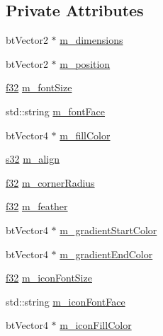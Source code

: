 \subsection*{Private Attributes}
\begin{DoxyCompactItemize}
\item 
bt\+Vector2 $\ast$ \mbox{\hyperlink{classnjli_1_1_checkbox_h_u_d_af97939ec2d8f7137dd7206aaef82ebeb}{m\+\_\+dimensions}}
\item 
bt\+Vector2 $\ast$ \mbox{\hyperlink{classnjli_1_1_checkbox_h_u_d_a15d15c4ef020a1d109c1257b535ef6af}{m\+\_\+position}}
\item 
\mbox{\hyperlink{_util_8h_a5f6906312a689f27d70e9d086649d3fd}{f32}} \mbox{\hyperlink{classnjli_1_1_checkbox_h_u_d_a0e1d4b8f2b740d9d6189da68959b34d5}{m\+\_\+font\+Size}}
\item 
std\+::string \mbox{\hyperlink{classnjli_1_1_checkbox_h_u_d_ae30d4899d8b3bb39b583005d30e94d80}{m\+\_\+font\+Face}}
\item 
bt\+Vector4 $\ast$ \mbox{\hyperlink{classnjli_1_1_checkbox_h_u_d_acaa459636c3131b4991b2a7d74d4b6c5}{m\+\_\+fill\+Color}}
\item 
\mbox{\hyperlink{_util_8h_aa62c75d314a0d1f37f79c4b73b2292e2}{s32}} \mbox{\hyperlink{classnjli_1_1_checkbox_h_u_d_a57ec6ee10cf894de31c8f5d3c1987cbf}{m\+\_\+align}}
\item 
\mbox{\hyperlink{_util_8h_a5f6906312a689f27d70e9d086649d3fd}{f32}} \mbox{\hyperlink{classnjli_1_1_checkbox_h_u_d_a4a42a1e6ec369fe33ea9a7d6b546048a}{m\+\_\+corner\+Radius}}
\item 
\mbox{\hyperlink{_util_8h_a5f6906312a689f27d70e9d086649d3fd}{f32}} \mbox{\hyperlink{classnjli_1_1_checkbox_h_u_d_a06f4f2ae5cbff9350537724e8b2f5f5f}{m\+\_\+feather}}
\item 
bt\+Vector4 $\ast$ \mbox{\hyperlink{classnjli_1_1_checkbox_h_u_d_a1f692a5cf90de60c6a1d3747b1f3710d}{m\+\_\+gradient\+Start\+Color}}
\item 
bt\+Vector4 $\ast$ \mbox{\hyperlink{classnjli_1_1_checkbox_h_u_d_a3f4833ec007b2ee45c150e5b851dc1d0}{m\+\_\+gradient\+End\+Color}}
\item 
\mbox{\hyperlink{_util_8h_a5f6906312a689f27d70e9d086649d3fd}{f32}} \mbox{\hyperlink{classnjli_1_1_checkbox_h_u_d_ac904923a373f4c67ab94dbf407459245}{m\+\_\+icon\+Font\+Size}}
\item 
std\+::string \mbox{\hyperlink{classnjli_1_1_checkbox_h_u_d_ae3f331029c085859eb0e47c66d16ae56}{m\+\_\+icon\+Font\+Face}}
\item 
bt\+Vector4 $\ast$ \mbox{\hyperlink{classnjli_1_1_checkbox_h_u_d_ab725b03ce1e63bef6675bea2f5cef7a8}{m\+\_\+icon\+Fill\+Color}}

\end{DoxyCompactItemize}
